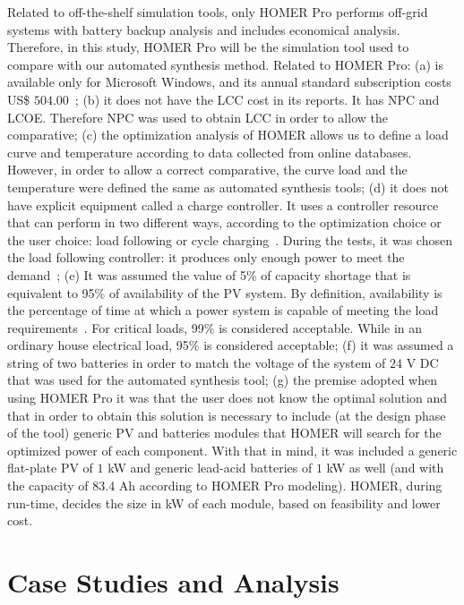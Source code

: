 \documentclass[journal]{IEEEtran}
\begin{document}
Related to off-the-shelf simulation tools, only HOMER Pro performs off-grid systems with battery backup analysis and includes economical analysis. Therefore, in this study, HOMER Pro will be the simulation tool used to compare with our automated synthesis method. Related to HOMER Pro: (a) is available only for Microsoft Windows, and its annual standard subscription costs US\$ $504.00$~\cite{HOMER}; (b) it does not have the LCC cost in its reports. It has NPC and LCOE. Therefore NPC was used to obtain LCC in order to allow the comparative; (c) the optimization analysis of HOMER allows us to define a load curve and temperature according to data collected from online databases. However, in order to allow a correct comparative, the curve load and the temperature were defined the same as automated synthesis tools; (d) it does not have explicit equipment called a charge controller. It uses a controller resource that can perform in two different ways, according to the optimization choice or the user choice: load following or cycle charging~\cite{HOMER}. During the tests, it was chosen the load following controller: it produces only enough power to meet the demand~\cite{HOMER}; (e) It was assumed the value of 5\% of capacity shortage that is equivalent to 95\% of availability of the PV system. By definition, availability is the percentage of time at which a power system is capable of meeting the load requirements~\cite{Khatib2014}. For critical loads, 99\% is considered acceptable. While in an ordinary house electrical load, 95\% is considered acceptable; (f) it was assumed a string of two batteries in order to match the voltage of the system of $24$ V DC that was used for the automated synthesis tool; (g) the premise adopted when using HOMER Pro it was that the user does not know the optimal solution and that in order to obtain this solution is necessary to include (at the design phase of the tool) generic PV and batteries modules that HOMER will search for the optimized power of each component. With that in mind, it was included a generic flat-plate PV of $1$ kW and generic lead-acid batteries of $1$ kW as well (and with the capacity of $83.4$ Ah according to HOMER Pro modeling). HOMER, during run-time, decides the size in kW of each module, based on feasibility and lower cost.

\section{Case Studies and Analysis}
\label{sec:Results}
\end{document}
